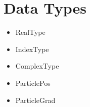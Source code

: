 \section{Data Types}

\begin{itemize}
\item RealType
\item IndexType
\item ComplexType
\item ParticlePos
\item ParticleGrad 
\end{itemize}

